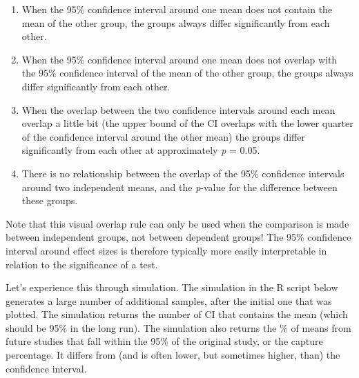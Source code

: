 \documentclass[
  oneside]{book}
\providecommand{\tightlist}{%
  \setlength{\itemsep}{0pt}\setlength{\parskip}{0pt}}
\begin{document}
\begin{enumerate}
\def\labelenumi{\Alph{enumi})}
\tightlist
\item
  When the 95\% confidence interval around one mean does not contain the mean of the other group, the groups always differ significantly from each other.
\item
  When the 95\% confidence interval around one mean does not overlap with the 95\% confidence interval of the mean of the other group, the groups always differ significantly from each other.
\item
  When the overlap between the two confidence intervals around each mean overlap a little bit (the upper bound of the CI overlaps with the lower quarter of the confidence interval around the other mean) the groups differ significantly from each other at approximately \emph{p} = 0.05.
\item
  There is no relationship between the overlap of the 95\% confidence intervals around two independent means, and the \emph{p}-value for the difference between these groups.
\end{enumerate}

Note that this visual overlap rule can only be used when the comparison is made between independent groups, not between dependent groups! The 95\% confidence interval around effect sizes is therefore typically more easily interpretable in relation to the significance of a test.

Let's experience this through simulation. The simulation in the R script below generates a large number of additional samples, after the initial one that was plotted. The simulation returns the number of CI that contains the mean (which should be 95\% in the long run). The simulation also returns the \% of means from future studies that fall within the 95\% of the original study, or the capture percentage. It differs from (and is often lower, but sometimes higher, than) the confidence interval.
\end{document}
